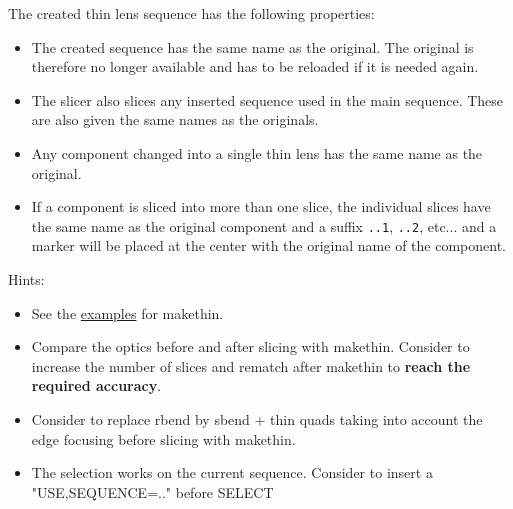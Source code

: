 The created thin lens sequence has the following properties: 
\begin{itemize}
	\item The created sequence has the same name as the original. The original is therefore no longer  available and has to be reloaded if it is needed again.  
	\item The slicer also slices any inserted sequence used in the main sequence. These are also given the same names as the originals. 
	\item Any component changed into a single thin lens has the same name as the original. 
	\item If a component is sliced into more than one slice, the individual slices have the same name as the original component and a suffix \texttt{..1}, \texttt{..2}, etc... and a marker  will be placed at the center with the original name of the component. 
\end{itemize} 
Hints: 
\begin{itemize}
	\item See the \href{http://cern.ch/frs/mad-X_examples/makethin/}{examples} for makethin. 
	\item Compare the optics before and after slicing with makethin. Consider to increase the number of slices and rematch after makethin to \textbf{reach the required accuracy}. 
	\item Consider to replace rbend by sbend + thin quads taking into account the edge focusing before slicing with makethin. 
	\item The selection works on the current sequence. Consider to insert a "USE,SEQUENCE=.." before SELECT 
\end{itemize}



